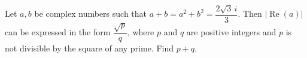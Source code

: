 Let $a,b$ be complex numbers such that $a+b=a^2+b^2=\dfrac{2\sqrt3\,i}{3}$. Then $\left|\operatorname{Re}(a)\right|$ can be expressed in the form $\dfrac{\sqrt p}{q}$, where $p$ and $q$ are positive integers and $p$ is not divisible by the square of any prime. Find $p+q$.
